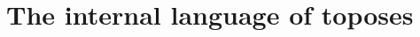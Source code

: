 \documentclass[12pt,utf8,notheorems,compress,t]{beamer}
\renewcommand{\_}{\mathpunct{.}}
\newcommand{\?}{\,{:}\,}
\newenvironment{changemargin}[2]{%
  \begin{list}{}{%
    \setlength{\topsep}{0pt}%
    \setlength{\leftmargin}{#1}%
    \setlength{\rightmargin}{#2}%
    \setlength{\listparindent}{\parindent}%
    \setlength{\itemindent}{\parindent}%
    \setlength{\parsep}{\parskip}%
  }%
  \item[]}{\end{list}}
\begin{document}
%
%
%
%


\section[Internal language of toposes]{The internal language of toposes}
\end{document}
